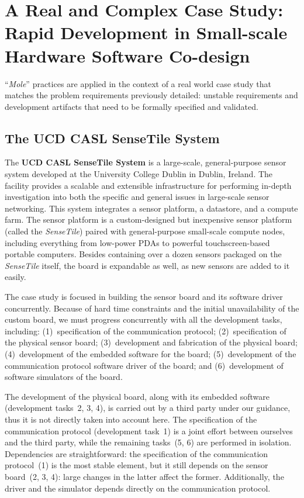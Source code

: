 \documentclass[english]{lni}
\newcommand{\ST}{\emph{SenseTile}\xspace}
\newcommand{\mole}{``\emph{Mole}''\xspace}
\begin{document}
\section{A Real and Complex Case Study: \\ Rapid Development in Small-scale Hardware Software Co-design}
\label{subsec:a_real_and_complex_case_study}

\mole practices are applied in the context of a real world case study that matches the problem requirements previously detailed: unstable requirements and development artifacts that need to be formally specified and validated.  

\subsection{The UCD CASL SenseTile System}
\label{sec:ucd-casl-sensetile}

The \textbf{UCD CASL SenseTile System} is a large-scale, general-purpose sensor system developed at the University College Dublin in Dublin, Ireland.  
The facility provides a scalable and extensible infrastructure for performing in-depth investigation into both the specific and general issues in large-scale sensor networking. 
This system integrates a sensor platform, a datastore, and a compute farm.  
The sensor platform is a custom-designed but inexpensive sensor platform (called the \ST) paired with general-purpose small-scale compute nodes, including everything from low-power PDAs to powerful touchscreen-based portable computers.  
Besides containing over a dozen sensors packaged on the \ST itself, the board is expandable as well, as new sensors are added to it easily.

The case study is focused in building the sensor board and its software driver concurrently.  
Because of hard time constraints and the initial unavailability of the custom board, we must progress concurrently with all the development tasks, including: (1)~specification of the communication protocol; (2)~specification of the physical sensor board; (3)~development and fabrication of the physical board; (4)~development of the embedded software for the board; (5)~development of the communication protocol software driver of the board; and (6)~development of software simulators of the board.

The development of the physical board, along with its embedded software (development tasks~2, 3, 4), is carried out by a third party under our guidance, thus it is not directly taken into account here. 
The specification of the communication protocol (development task~1) is a joint effort between ourselves and the third party, while the remaining tasks~(5, 6) are performed in isolation.  
Dependencies are straightforward: the specification of the communication protocol~(1) is the most stable element, but it still depends on the sensor board~(2, 3, 4): large changes in the latter affect the former.
Additionally, the driver and the simulator depends directly on the communication protocol.
\end{document}
